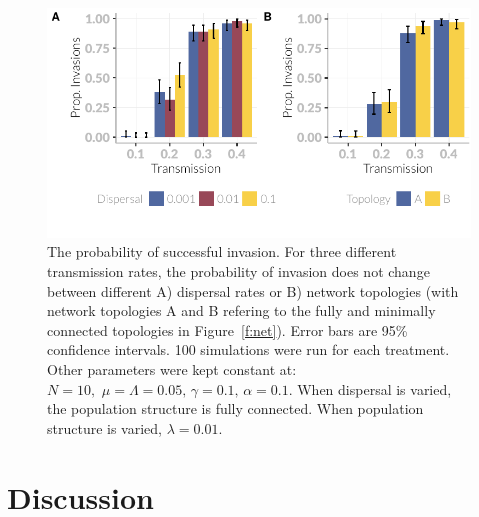 \begin{knitrout}\footnotesize
{}\color{fgcolor}\begin{figure}[t]

{\centering \includegraphics[width=\textwidth]{figure/invasionPropPlots-1} 

}

\caption[The probability of invasion across different dispersal rates and network topologies.]{The probability of successful invasion. 
  For three different transmission rates, the probability of invasion does not change between different A) dispersal rates or B) network topologies (with network topologies A and B refering to the fully and minimally connected topologies in Figure~\ref{f:net}). 
  Error bars are 95\% confidence intervals. 
  100 simulations were run for each treatment.
  Other parameters were kept constant at: $N = 10,\, \, \mu = \Lambda = 0.05,\, \gamma = 0.1,\, \alpha = 0.1$. 
  When dispersal is varied, the population structure is fully connected. When population structure is varied, $\lambda = 0.01$.}\label{f:invasionPropPlots}
\end{figure}


\end{knitrout}






\section{Discussion}\label{s:sims1Disc}


